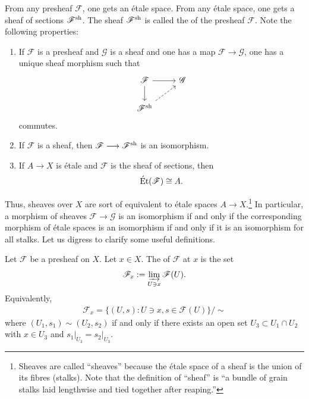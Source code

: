 \documentclass [11 pt, oneside, margin = 1 in] {article}
\begin{document}
From any presheaf $\mathscr{F}$, one gets an \'etale space. From any \'etale space, one gets a sheaf of sections $\mathscr{F}\textsuperscript{sh}$. The sheaf $\mathscr{F}\textsuperscript{sh}$ is called the  of the presheaf $\mathscr{F}$. Note the following properties:
\begin{enumerate}
	\item If $\mathscr{F}$ is a presheaf and $\mathscr{G}$ is a sheaf and one has a map $\mathscr{F}\longrightarrow \mathscr{G}$, one has a unique sheaf morphism such that
		\[
		\begin{tikzcd}
			\mathscr{F} \ar[r] \ar[d] & \mathscr{G}\\
			\mathscr{F}\sh \ar[ur, dashed]
		\end{tikzcd}
		\]
		commutes.
	\item If $\mathscr{F}$ is a sheaf, then $\mathscr{F}\longrightarrow \mathscr{F}\textsuperscript{sh}$ is an isomorphism. 
	\item If $A\longrightarrow X$ is \'etale and $\mathscr{F}$ is the sheaf of sections, then
		\begin{align*}
			\operatorname{\acute Et} ( \mathscr{F} ) \cong A.
		\end{align*}
\end{enumerate}

Thus, sheaves over $X$ are sort of equivalent to \'etale spaces $A\longrightarrow X$.\footnote{Sheaves are called ``sheaves'' because the \'etale space of a sheaf is the union of its fibres (stalks). Note that the definition of ``sheaf'' is ``a bundle of grain stalks laid lengthwise and tied together after reaping.''} In particular, a morphism of sheaves $\mathscr{F}\longrightarrow \mathscr{G}$ is an isomorphism if and only if the corresponding morphism of \'etale spaces is an isomorphism if and only if it is an isomorphism for all stalks. Let us digress to clarify some useful definitions.

 \begin{definition}[ ]\label{}\text{}
Let $\mathscr{F}$ be a presheaf on $X$. Let $x\in X$. The  of $\mathscr{F}$ at $x$ is the set
\begin{align*}
	\mathscr{F}_x := \varinjlim_{U\ni x} \mathscr{F}(U).
\end{align*}
Equivalently,
\begin{align*}
	\mathscr{F}_x = \{(U,s) : U\ni x, s\in  \mathscr{F}(U)\} / \sim
\end{align*}
where $(U_1,s_1)\sim(U_2,s_2) $ if and only if there exists an open set $U_3 \subset U_1\cap U_2$ with $x\in U_3$ and $s_1\big |_{U_3} = s_2\big |_{U_3}$.
\end{definition}
\end{document}
